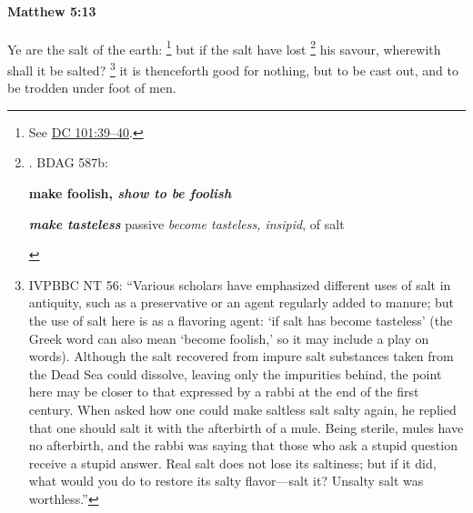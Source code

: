 		\paragraph{Matthew 5:13} %
			\label{MATTHEW-5-13}

			Ye are the salt of the earth:%
				\footnote{%
					See \hyperref[DC101-39]{DC 101:39--40}.
					}
			but if the salt have lost%
				\footnote{%
					. BDAG 587b: 
						\begin{compactdesc}
							\item[1] \textbf{make foolish, \textit{show to be foolish}}
							\item[2] \textbf{\textit{make tasteless}} passive \textit{become tasteless, insipid}, of salt
						\end{compactdesc}
					}
			his savour, wherewith shall it be salted?%
				\footnote{%
					IVPBBC NT 56: ``Various scholars have emphasized different uses of salt in antiquity, such as a preservative or an agent regularly added to manure; but the use of salt here is as a flavoring agent: `if salt has become tasteless' (the Greek word can also mean `become foolish,' so it may include a play on words). Although the salt recovered from impure salt substances taken from the Dead Sea could dissolve, leaving only the impurities behind, the point here may be closer to that expressed by a rabbi at the end of the first century. When asked how one could make saltless salt salty again, he replied that one should salt it with the afterbirth of a mule. Being sterile, mules have no afterbirth, and the rabbi was saying that those who ask a stupid question receive a stupid answer. Real salt does not lose its saltiness; but if it did, what would you do to restore its salty flavor---salt it? Unsalty salt was worthless.''
					}
			it is thenceforth good for nothing, but to be cast out, and to be trodden under foot of men.

			\begin{framed}
			\scriptsize
				\begin{compactdesc}
					\item[SBLG] 
				\end{compactdesc}
			\end{framed}

